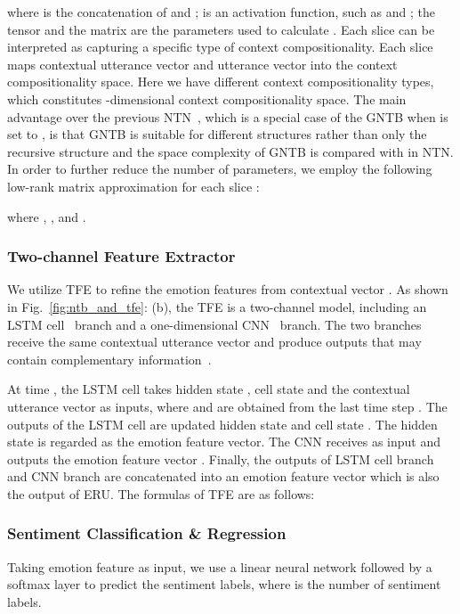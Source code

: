 \documentclass[journal]{IEEEtran}
\begin{document}
where  is the concatenation of  and ;  is an activation function, such as  and ; the tensor  and the matrix  are the parameters used to calculate . Each slice  can be interpreted as capturing a specific type of context compositionality. Each slice  maps contextual utterance vector  and utterance vector  into the context compositionality space. Here we have  different context compositionality types, which constitutes -dimensional context compositionality space. The main advantage over the previous NTN~\cite{socher2013reasoning}, which is a special case of the GNTB when  is set to , is that GNTB is suitable for different structures rather than only the recursive structure and the space complexity of GNTB is  compared with  in NTN. In order to further reduce the number of parameters, we employ the following low-rank matrix approximation for each slice :

where , ,  and .


\subsubsection{Two-channel Feature Extractor}

We utilize TFE to refine the emotion features from contextual vector . As shown in Fig.~\ref{fig:ntb_and_tfe}: (b), the TFE is a two-channel model, including an  LSTM cell~\cite{hochreiter1997long} branch and a one-dimensional CNN~\cite{kim2014convolutional} branch. The two branches receive the same contextual utterance vector  and produce outputs that may contain complementary information~\cite{li2020user}.

At time , the LSTM cell takes hidden state , cell state  and the contextual utterance vector  as inputs, where  and  are obtained from the last time step . The outputs of the LSTM cell are updated hidden state  and cell state . The hidden state  is regarded as the emotion feature vector. The CNN receives  as input and outputs the emotion feature vector . Finally, the outputs of LSTM cell branch  and CNN branch  are concatenated into an emotion feature vector  which is also the output of ERU. The formulas of TFE are as follows:



\subsubsection{Sentiment Classification \& Regression}
Taking emotion feature  as input, we use a linear neural network  followed by a softmax layer to predict the sentiment labels, where  is the number of sentiment labels.
\end{document}
